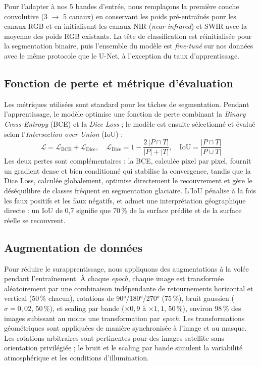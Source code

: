 \documentclass[11pt]{article}
\begin{document}
Pour l'adapter à nos 5 bandes d'entrée, nous remplaçons la première couche convolutive (3 $\to$ 5 canaux) en conservant les poids pré-entraînés pour les canaux RGB et en initialisant les canaux NIR (\emph{near infrared}) et SWIR avec la moyenne des poids RGB existants. La tête de classification est réinitialisée pour la segmentation binaire, puis l'ensemble du modèle est \emph{fine-tuné} sur nos données avec le même protocole que le U-Net, à l'exception du taux d'apprentissage.

\subsection{Fonction de perte et métrique d'évaluation}

Les métriques utilisées sont standard pour les tâches de
segmentation. Pendant l'apprentissage, le modèle optimise une
fonction de perte combinant la \emph{Binary Cross-Entropy} (BCE) et la
\emph{Dice Loss} ; le modèle est ensuite sélectionné et évalué selon
l'\textit{Intersection over Union} (IoU) \citep{IoU2015} :
\[
\mathcal{L} = \mathcal{L}_{\text{BCE}} + \mathcal{L}_{\text{Dice}},
\quad
\mathcal{L}_{\text{Dice}} = 1 - \frac{2\,|P \cap T|}{|P| + |T|},
\quad
\mathrm{IoU} = \frac{|P \cap T|}{|P \cup T|}
\]
Les deux pertes sont complémentaires : la BCE, calculée pixel
par pixel, fournit un gradient dense et bien conditionné qui
stabilise la convergence, tandis que la Dice Loss, calculée
globalement, optimise directement le recouvrement et gère le
déséquilibre de classes fréquent en segmentation glaciaire.
L'IoU pénalise à la fois les faux positifs et les faux négatifs,
et admet une interprétation géographique directe : un IoU de 0,7
signifie que 70\,\% de la surface prédite et de la surface réelle
se recouvrent.

\subsection{Augmentation de données}

Pour réduire le surapprentissage, nous appliquons des augmentations à la volée pendant l'entraînement. À chaque \emph{epoch}, chaque image est transformée aléatoirement par une combinaison indépendante de retournements horizontal et vertical (50\,\% chacun), rotations de 90°/180°/270° (75\,\%), bruit gaussien ($\sigma = 0{,}02$, 50\,\%), et scaling par bande ($\times 0{,}9$ à $\times 1{,}1$, 50\,\%), environ 98\,\% des images subissant au moins une transformation par \emph{epoch}. Les transformations géométriques sont appliquées de manière synchronisée à l'image et au masque. Les rotations arbitraires sont pertinentes pour des images satellite sans orientation privilégiée ; le bruit et le scaling par bande simulent la variabilité atmosphérique et les conditions d'illumination.
\end{document}
